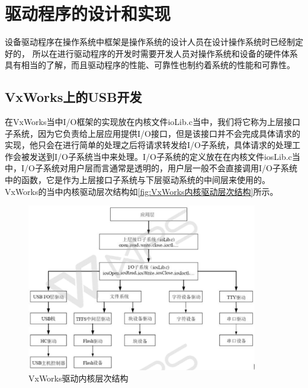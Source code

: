 \chapter{驱动程序的设计和实现}
	
	设备驱动程序在操作系统中框架是操作系统的设计人员在设计操作系统时已经制定好的，	所以在进行驱动程序的开发时需要开发人员对操作系统和设备的硬件体系具有相当的了解，而且驱动程序的性能、可靠性也制约着系统的性能和可靠性。	


\section{VxWorks上的USB开发}
	在VxWorks当中I/O框架的实现放在内核文件ioLib.c当中，我们将它称为上层接口子系统，因为它负责给上层应用提供I/O接口，但是该接口并不会完成具体请求的实现，他只会在进行简单的处理之后将请求转发给I/O子系统，具体请求的处理工作会被发送到I/O子系统当中来处理。I/O子系统的定义放在在内核文件iosLib.c当中，I/O子系统对用户层而言通常是透明的，用户层一般不会直接调用I/O子系统中的函数，它是作为上层接口子系统与下层驱动系统的中间层来使用的。VxWorks的当中内核驱动层次结构如\autoref{fig:VxWorks内核驱动层次结构}所示。	

\begin{figure}[!h]
\centering
\includegraphics[width=0.9\textwidth]{./graphics/vxworks-kernel-diagram.pdf}
\caption{VxWorks驱动内核层次结构}\label{fig:VxWorks内核驱动层次结构}
\end{figure}	
			
